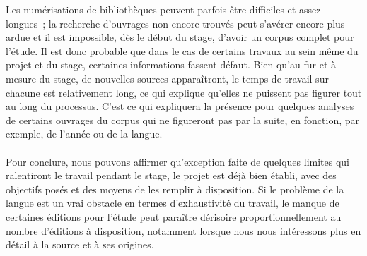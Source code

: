 Les numérisations de bibliothèques peuvent parfois être difficiles et assez longues~; la recherche d'ouvrages non encore trouvés peut s'avérer encore plus ardue et il est impossible, dès le début du stage, d'avoir un corpus complet pour l'étude. Il est donc probable que dans le cas de certains travaux au sein même du projet et du stage, certaines informations fassent défaut. Bien qu'au fur et à mesure du stage, de nouvelles sources apparaîtront, le temps de travail sur chacune est relativement long, ce qui explique qu'elles ne puissent pas figurer tout au long du processus. C'est ce qui expliquera la présence pour quelques analyses de certains ouvrages du corpus qui ne figureront pas par la suite, en fonction, par exemple, de l'année ou de la langue.

\paragraph{}Pour conclure, nous pouvons affirmer qu'exception faite de quelques limites qui ralentiront le travail pendant le stage, le projet est déjà bien établi, avec des objectifs posés et des moyens de les remplir à disposition. Si le problème de la langue est un vrai obstacle en termes d'exhaustivité du travail, le manque de certaines éditions pour l'étude peut paraître dérisoire proportionnellement au nombre d'éditions à disposition, notamment lorsque nous nous intéressons plus en détail à la source et à ses origines.